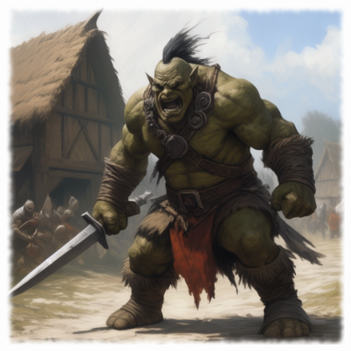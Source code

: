 

\begin{figure}[h]
\begin{center}
\includegraphics[scale=0.24]{img/ai-images/orc.png}
\end{center}
\end{figure}

